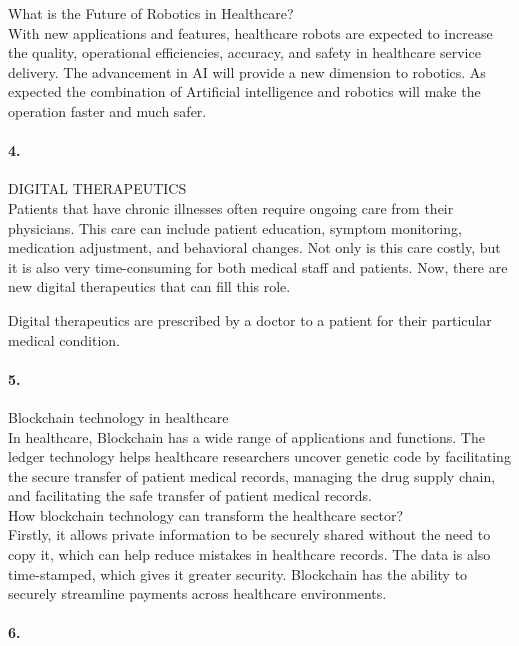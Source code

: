 \documentclass[12pt]{report}
\begin{document}
What is the Future of Robotics in Healthcare?\\
With new applications and features, healthcare robots are expected to increase the quality, operational efficiencies, accuracy, and safety in healthcare service delivery. The advancement in AI will provide a new dimension to robotics. As expected the combination of Artificial intelligence and robotics will make the operation faster and much safer.\paragraph{4.}
 

DIGITAL THERAPEUTICS\\
Patients that have chronic illnesses often require ongoing care from their physicians. This care can include patient education, symptom monitoring, medication adjustment, and behavioral changes. Not only is this care costly, but it is also very time-consuming for both medical staff and patients. Now, there are new digital therapeutics that can fill this role.

Digital therapeutics are prescribed by a doctor to a patient for their particular medical condition.\paragraph{5.}

Blockchain technology in healthcare\\
In healthcare, Blockchain has a wide range of applications and functions. The ledger technology helps healthcare researchers uncover genetic code by facilitating the secure transfer of patient medical records, managing the drug supply chain, and facilitating the safe transfer of patient medical records.\\

How blockchain technology can transform the healthcare sector?\\
Firstly, it allows private information to be securely shared without the need to copy it, which can help reduce mistakes in healthcare records. The data is also time-stamped, which gives it greater security. Blockchain has the ability to securely streamline payments across healthcare environments.\paragraph{6.}
\end{document}
